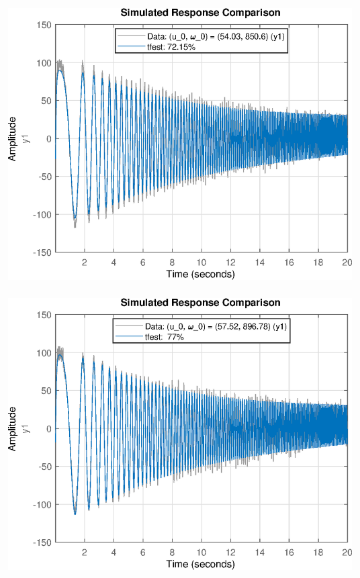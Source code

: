 \begin{figure}[H]
    \centering
    \begin{minipage}{0.32\textwidth}
       \begin{figure}[H]
            \includegraphics[width = \textwidth]{./figs/small_perturbation/time_Compare_1700.eps}
       \end{figure}
    \end{minipage}
    \begin{minipage}{0.32\textwidth}
       \begin{figure}[H]
            \includegraphics[width = \textwidth]{./figs/small_perturbation/time_Compare_1750.eps}
       \end{figure}
    \end{minipage}
\end{figure}
